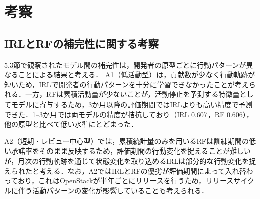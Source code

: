 \documentclass[submit,noauthor,ses,dvipdfmx]{ipsj}
\newcommand{\todo}[1]{\colorbox{yellow}{{\bf TODO}:}{\color{red} {\textbf{[#1]}}}}
\newcommand{\fixstart}{\color{magenta}}
\newcommand{\fixend}{\color{black}}
\begin{document}






\section{考察}\label{sec:discuss}

\subsection{IRLとRFの補完性に関する考察}
5.3節で観察されたモデル間の補完性は，開発者の原型ごとに行動パターンが異なることによる結果と考える．
A1（低活動型）は，貢献数が少なく行動軌跡が\fixstart 短い\fixend ため，IRLで開発者の行動パターンを十分に学習できなかったことが考えられる．一方，RFは累積活動量が少ないことが，活動停止を予測する特徴量としてモデルに寄与するため，3か月以降の評価期間ではIRLよりも高い精度で予測できた．1--3か月では\fixstart 両モデルの精度が拮抗しており（IRL 0.607，RF 0.606），他の原型と比べて低い水準にとどまった\fixend ．

A2（短期・レビュー中心型）では，累積統計量のみを用いるRFは訓練期間の低い承諾率をそのまま反映するため，評価期間の行動変化を捉えることが難しいが，月次の行動軌跡を通じて状態変化を取り込めるIRLは部分的な行動変化を捉えられたと考える．なお，A2ではIRLとRFの優劣が評価期間によって入れ替わっており，これはOpenStackが半年ごとにリリースを行うため，リリースサイクルに伴う活動パターンの変化が影響していることも考えられる．
\end{document}
